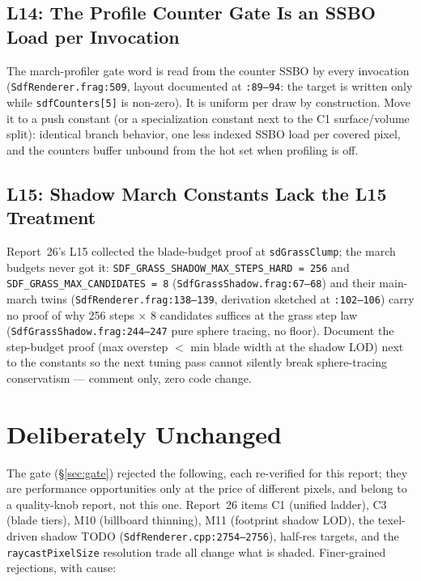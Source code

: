 \documentclass[11pt,a4paper]{article}
\begin{document}
\subsection{L14: The Profile Counter Gate Is an SSBO Load per Invocation}

The march-profiler gate word is read from the counter SSBO by every
invocation (\texttt{SdfRenderer.frag:509}, layout documented at
\texttt{:89--94}: the target is written only while \texttt{sdfCounters[5]}
is non-zero). It is uniform per draw by construction. Move it to a push
constant (or a specialization constant next to the C1 surface/volume
split): identical branch behavior, one less indexed SSBO load per covered
pixel, and the counters buffer unbound from the hot set when profiling is
off.

\subsection{L15: Shadow March Constants Lack the L15 Treatment}

Report~26's L15 collected the blade-budget proof at
\texttt{sdGrassClump}; the march budgets never got it:
\texttt{SDF\_GRASS\_SHADOW\_MAX\_STEPS\_HARD = 256} and
\texttt{SDF\_GRASS\_MAX\_CANDIDATES = 8}
(\texttt{SdfGrassShadow.frag:67--68}) and their main-march twins
(\texttt{SdfRenderer.frag:138--139}, derivation sketched at
\texttt{:102--106}) carry no proof of why 256 steps $\times$ 8 candidates
suffices at the grass step law (\texttt{SdfGrassShadow.frag:244--247} pure
sphere tracing, no floor). Document the step-budget proof (max overstep
$<$ min blade width at the shadow LOD) next to the constants so the next
tuning pass cannot silently break sphere-tracing conservatism --- comment
only, zero code change.

\section{Deliberately Unchanged}
\label{sec:unchanged}

The gate (\S\ref{sec:gate}) rejected the following, each re-verified for
this report; they are performance opportunities only at the price of
different pixels, and belong to a quality-knob report, not this one.
Report~26 items C1 (unified ladder), C3 (blade tiers), M10 (billboard
thinning), M11 (footprint shadow LOD), the texel-driven shadow TODO
(\texttt{SdfRenderer.cpp:2754--2756}), half-res targets, and the
\texttt{raycastPixelSize} resolution trade all change what is shaded.
Finer-grained rejections, with cause:
\end{document}
